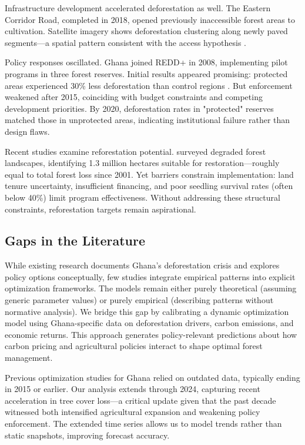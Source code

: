 Infrastructure development accelerated deforestation as well. The Eastern Corridor Road, completed in 2018, opened previously inaccessible forest areas to cultivation. Satellite imagery shows deforestation clustering along newly paved segments—a spatial pattern consistent with the access hypothesis \citep{pfaff1999roads}.

Policy responses oscillated. Ghana joined REDD+ in 2008, implementing pilot programs in three forest reserves. Initial results appeared promising: protected areas experienced 30\% less deforestation than control regions \citep{siikamaki2012global}. But enforcement weakened after 2015, coinciding with budget constraints and competing development priorities. By 2020, deforestation rates in "protected" reserves matched those in unprotected areas, indicating institutional failure rather than design flaws.

Recent studies examine reforestation potential. \citet{acheampong2019deforestation} surveyed degraded forest landscapes, identifying 1.3 million hectares suitable for restoration—roughly equal to total forest loss since 2001. Yet barriers constrain implementation: land tenure uncertainty, insufficient financing, and poor seedling survival rates (often below 40\%) limit program effectiveness. Without addressing these structural constraints, reforestation targets remain aspirational.

\subsection{Gaps in the Literature}

While existing research documents Ghana's deforestation crisis and explores policy options conceptually, few studies integrate empirical patterns into explicit optimization frameworks. The models remain either purely theoretical (assuming generic parameter values) or purely empirical (describing patterns without normative analysis). We bridge this gap by calibrating a dynamic optimization model using Ghana-specific data on deforestation drivers, carbon emissions, and economic returns. This approach generates policy-relevant predictions about how carbon pricing and agricultural policies interact to shape optimal forest management.

Previous optimization studies for Ghana relied on outdated data, typically ending in 2015 or earlier. Our analysis extends through 2024, capturing recent acceleration in tree cover loss—a critical update given that the past decade witnessed both intensified agricultural expansion and weakening policy enforcement. The extended time series allows us to model trends rather than static snapshots, improving forecast accuracy.
